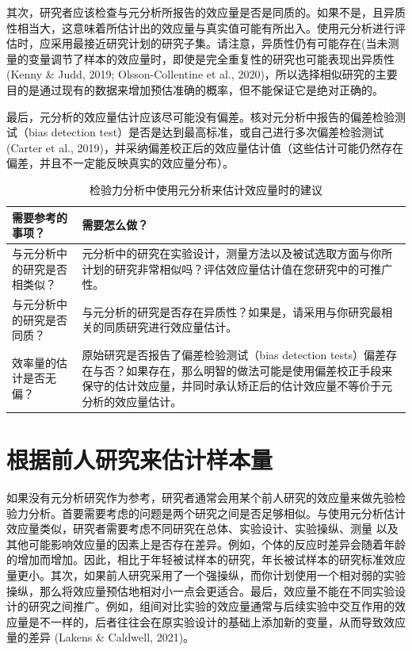 \documentclass[
  letterpaper,
  DIV=11,
  numbers=noendperiod]{scrreprt}
\begin{document}
其次，研究者应该检查与元分析所报告的效应量是否是同质的。如果不是，且异质性相当大，这意味着所估计出的效应量与真实值可能有所出入。使用元分析进行评估时，应采用最接近研究计划的研究子集。请注意，异质性仍有可能存在(当未测量的变量调节了样本的效应量时，即使是完全重复性的研究也可能表现出异质性(Kenny
\& Judd, 2019; Olsson-Collentine et al.,
2020)，所以选择相似研究的主要目的是通过现有的数据来增加预估准确的概率，但不能保证它是绝对正确的。

最后，元分析的效应量估计应该尽可能没有偏差。核对元分析中报告的偏差检验测试（bias
detection test）是否是达到最高标准，或自己进行多次偏差检验测试(Carter et
al.,
2019)，并采纳偏差校正后的效应量估计值（这些估计可能仍然存在偏差，并且不一定能反映真实的效应量分布）。

\hypertarget{tbl-tablemetajust}{}
\begin{table}
\caption{\label{tbl-tablemetajust}检验力分析中使用元分析来估计效应量时的建议 }\tabularnewline

\centering
\begin{tabular}{>{\raggedright\arraybackslash}p{5cm}|>{\raggedright\arraybackslash}p{10cm}}
\hline
需要参考的事项？ & 需要怎么做？\\
\hline
与元分析中的研究是否相类似？ & 元分析中的研究在实验设计，测量方法以及被试选取方面与你所计划的研究非常相似吗？评估效应量估计值在您研究中的可推广性。\\
\hline
与元分析中的研究是否同质？ & 与元分析的研究是否存在异质性？如果是，请采用与你研究最相关的同质研究进行效应量估计。\\
\hline
效率量的估计是否无偏？ & 原始研究是否报告了偏差检验测试（bias detection tests）偏差存在与否？如果存在，那么明智的做法可能是使用偏差校正手段来保守的估计效应量，并同时承认矫正后的估计效应量不等价于元分析的效应量估计。\\
\hline
\end{tabular}
\end{table}

\hypertarget{ux6839ux636eux524dux4ebaux7814ux7a76ux6765ux4f30ux8ba1ux6837ux672cux91cf}{%
\section{根据前人研究来估计样本量}\label{ux6839ux636eux524dux4ebaux7814ux7a76ux6765ux4f30ux8ba1ux6837ux672cux91cf}}

如果没有元分析研究作为参考，研究者通常会用某个前人研究的效应量来做先验检验力分析。首要需要考虑的问题是两个研究之间是否足够相似。与使用元分析估计效应量类似，研究者需要考虑不同研究在总体、实验设计、实验操纵、测量
以及其他可能影响效应量的因素上是否存在差异。例如，个体的反应时差异会随着年龄的增加而增加。因此，相比于年轻被试样本的研究，年长被试样本的研究标准效应量更小。其次，如果前人研究采用了一个强操纵，而你计划使用一个相对弱的实验操纵，那么将效应量预估地相对小一点会更适合。最后，效应量不能在不同实验设计的研究之间推广。例如，组间对比实验的效应量通常与后续实验中交互作用的效应量是不一样的，后者往往会在原实验设计的基础上添加新的变量，从而导致效应量的差异
(Lakens \& Caldwell, 2021)。
\end{document}
